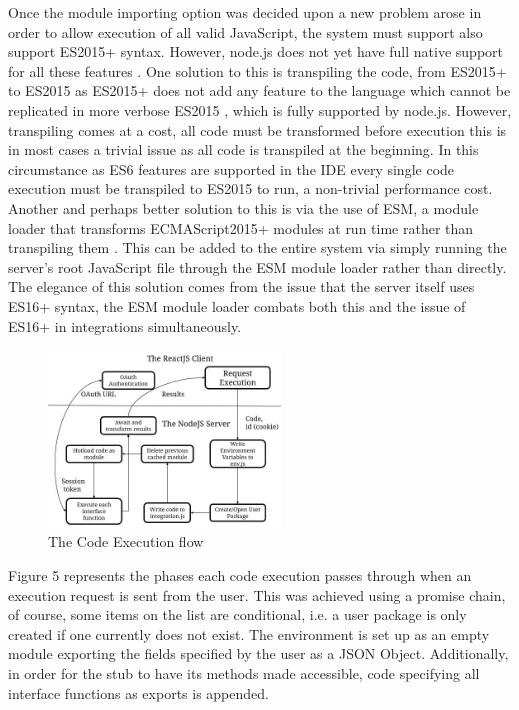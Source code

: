 \documentclass[jou,apacite]{apa6}
\begin{document}
			Once the module importing option was decided upon a new problem arose in order to allow execution of all valid JavaScript, the system must support also support ES2015+ syntax. However, node.js does not yet have full native support for all these features \cite{node.js2019}. One solution to this is transpiling the code, from ES2015+ to ES2015 as ES2015+ does not add any feature to the language which cannot be replicated in more verbose ES2015 \cite{Silva2017}, which is fully supported by node.js. However, transpiling comes at a cost, all code must be transformed before execution this is in most cases a trivial issue as all code is transpiled at the beginning. In this circumstance as ES6 features are supported in the IDE every single code execution must be transpiled to ES2015 to run, a non-trivial performance cost. Another and perhaps better solution to this is via the use of ESM, a module loader that transforms ECMAScript2015+ modules at run time rather than transpiling them \cite{powers2018}. This can be added to the entire system via simply running the server's root JavaScript file through the ESM module loader rather than directly. The elegance of this solution comes from the issue that the server itself uses ES16+ syntax,  the ESM module loader combats both this and the issue of ES16+ in integrations simultaneously.
			
				\begin{figure}[h]
\caption{The Code Execution flow}
\centering
\includegraphics[width=0.55\textwidth]{codeexecution}
\end{figure}
			
			Figure 5 represents the phases each code execution passes through when an execution request is sent from the user. This was achieved using a promise chain, of course, some items on the list are conditional, i.e. a user package is only created if one currently does not exist. The environment is set up as an empty module exporting the fields specified by the user as a JSON Object. Additionally, in order for the stub to have its methods made accessible,  code specifying all interface functions as exports is appended.
\end{document}
